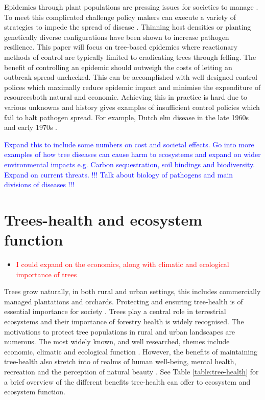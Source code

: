 Epidemics through plant populations are pressing issues for societies to manage \cite{pests-intro}. To meet this complicated challenge policy makers can execute a variety of strategies to impede the spread of disease \cite{Gilligan-disease-management}. Thinning host densities \cite{resiliency-density-reductions} or planting genetically diverse configurations \cite{burdon1982host, huang1980importance, doi:10.1094/PD-89-0969, genetic-heterogeneity} have been shown to increase pathogen resilience. This paper will focus on tree-based epidemics where reactionary methods of control are typically limited to eradicating trees through felling.
The benefit of controlling an epidemic should outweigh the costs of letting an outbreak spread unchecked. This can be accomplished with well designed control polices which maximally reduce epidemic impact and minimise the expenditure of resources\textemdash both natural and economic. Achieving this in practice is hard due to various unknowns \cite{13-challenges} and history gives examples of insufficient control policies which fail to halt pathogen spread. For example, Dutch elm disease in the late 1960s and early 1970s \cite{dutch-elm-mismanage}. 

\textcolor{blue}{Expand this to include some numbers on cost and societal effects. Go into more examples of how tree diseases can cause harm to ecosystems and expand on wider environmental impacts e.g. Carbon sequestration, soil bindings and biodiversity. Expand  on current threats. !!! Talk about biology of pathogens and main divisions of diseases !!!}

\section{Trees-health and ecosystem function}
\begin{itemize}
    \item \textcolor{red}{I could expand on the economics, along with climatic and ecological importance of trees}
\end{itemize}
Trees grow naturally, in both rural and urban settings, this includes commercially managed plantations and orchards. Protecting and ensuring tree-health is of essential importance for society \cite{Boyd1235773}. Trees play a central role in terrestrial ecosystems \cite{boyd2013consequence} and their importance of forestry health is widely recognised. The motivations to protect tree populations in rural and urban landscapes are numerous. The most widely known, and well researched, themes include economic, climatic and ecological function \cite{freer2017tree}. However, the benefits of maintaining tree-health also stretch into of realms of human well-being, mental health, recreation and the perception of natural beauty \cite{tyrvainen2005benefits}. See Table \ref{table:tree-health} for a brief overview of the different benefits tree-health can offer to ecosystem and ecosystem function.\\

